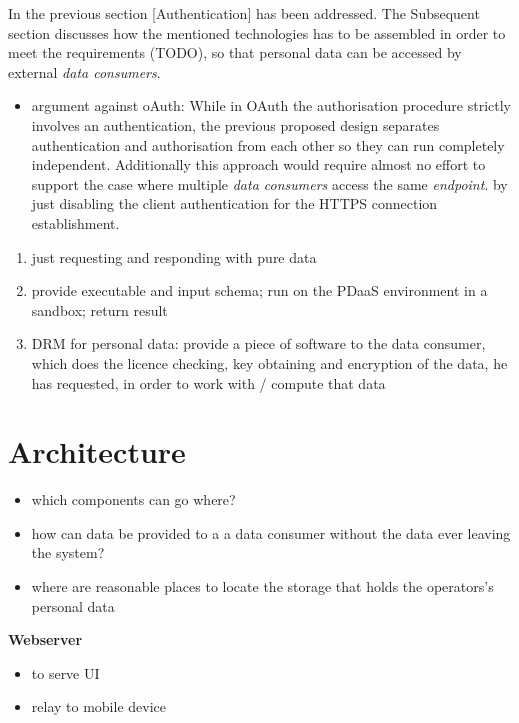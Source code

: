 \documentclass[12pt,english,a4paper,titlepage,cleardoublepage=empty,dottedtoc]{report}
\providecommand{\tightlist}{%
  \setlength{\itemsep}{0pt}\setlength{\parskip}{0pt}}
\begin{document}
In the previous section {[}Authentication{]} has been addressed. The
Subsequent section discusses how the mentioned technologies has to be
assembled in order to meet the requirements (TODO), so that personal
data can be accessed by external \emph{data consumers}.

\begin{itemize}
\tightlist
\item
  argument against oAuth: While in OAuth the authorisation procedure
  strictly involves an authentication, the previous proposed design
  separates authentication and authorisation from each other so they can
  run completely independent. Additionally this approach would require
  almost no effort to support the case where multiple \emph{data
  consumers} access the same \emph{endpoint}. by just disabling the
  client authentication for the HTTPS connection establishment.
\end{itemize}

\begin{enumerate}
\def\labelenumi{\Alph{enumi})}
\tightlist
\item
  just requesting and responding with pure data
\item
  provide executable and input schema; run on the PDaaS environment in a
  sandbox; return result
\item
  DRM for personal data: provide a piece of software to the data
  consumer, which does the licence checking, key obtaining and
  encryption of the data, he has requested, in order to work with /
  compute that data
\end{enumerate}

\section{Architecture}\label{architecture}

\begin{itemize}
\tightlist
\item
  which components can go where?
\item
  how can data be provided to a a data consumer without the data ever
  leaving the system?
\item
  where are reasonable places to locate the storage that holds the
  operators's personal data
\end{itemize}

\textbf{Webserver}

\begin{itemize}
\tightlist
\item
  to serve UI
\item
  relay to mobile device
\end{itemize}
\end{document}
